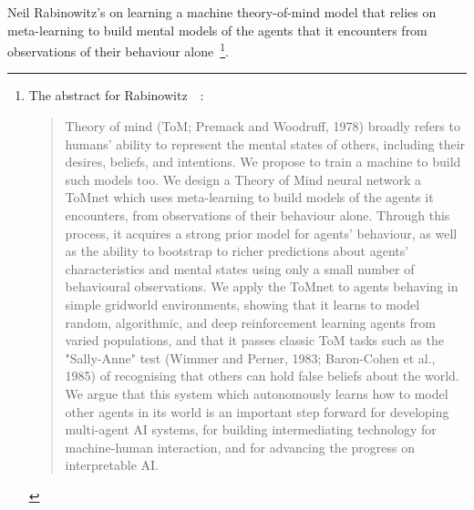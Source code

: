 

Neil Rabinowitz's {} on learning a machine theory-of-mind model that relies on meta-learning to build mental models of the agents that it encounters from observations of their behaviour alone~\cite{RabinowitzetalCoRR-18}\footnote{%
%
  The abstract for Rabinowitz~\etal{}~\cite{RabinowitzetalCoRR-18}:
%
  \begin{quotation}
%
    Theory of mind (ToM; Premack and Woodruff, 1978) broadly refers to humans' ability to represent the mental states of others, including their desires, beliefs, and intentions. We propose to train a machine to build such models too. We design a Theory of Mind neural network \emdash{} a ToMnet \emdash{} which uses meta-learning to build models of the agents it encounters, from observations of their behaviour alone. Through this process, it acquires a strong prior model for agents' behaviour, as well as the ability to bootstrap to richer predictions about agents' characteristics and mental states using only a small number of behavioural observations. We apply the ToMnet to agents behaving in simple gridworld environments, showing that it learns to model random, algorithmic, and deep reinforcement learning agents from varied populations, and that it passes classic ToM tasks such as the "Sally-Anne" test (Wimmer and Perner, 1983; Baron-Cohen et al., 1985) of recognising that others can hold false beliefs about the world. We argue that this system \emdash{} which autonomously learns how to model other agents in its world \emdash{} is an important step forward for developing multi-agent AI systems, for building intermediating technology for machine-human interaction, and for advancing the progress on interpretable AI.
%
\end{quotation}}.

